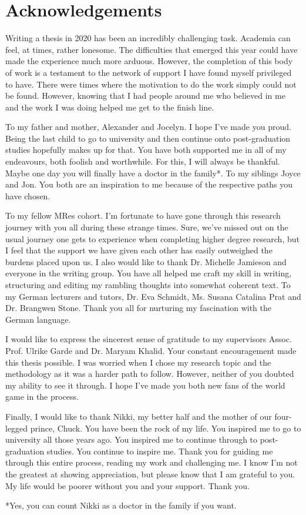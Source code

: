 

\chapter*{Acknowledgements}

Writing a thesis in 2020 has been an incredibly challenging task. Academia can feel, at times, rather lonesome. The difficulties that emerged this year could have made the experience much more arduous. However, the completion of this body of work is a testament to the network of support I have found myself privileged to have. There were times where the motivation to do the work simply could not be found. However, knowing that I had people around me who believed in me and the work I was doing helped me get to the finish line.


To my father and mother, Alexander and Jocelyn. I hope I’ve made you proud. Being the last child to go to university and then continue onto post-graduation studies hopefully makes up for that. You have both supported me in all of my endeavours, both foolish and worthwhile. For this, I will always be thankful. Maybe one day you will finally have a doctor in the family*. To my siblings Joyce and Jon. You both are an inspiration to me because of the respective paths you have chosen.


To my fellow MRes cohort. I’m fortunate to have gone through this research journey with you all during these strange times. Sure, we’ve missed out on the usual journey one gets to experience when completing higher degree research, but I feel that the support we have given each other has easily outweighed the burdens placed upon us. I also would like to thank Dr. Michelle Jamieson and everyone in the writing group. You have all helped me craft my skill in writing, structuring and editing my rambling thoughts into somewhat coherent text. To my German lecturers and tutors, Dr. Eva Schmidt, Ms. Susana Catalina Prat and Dr. Brangwen Stone. Thank you all for nurturing my fascination with the German language.


I would like to express the sincerest sense of gratitude to my supervisors Assoc. Prof. Ulrike Garde and Dr. Maryam Khalid. Your constant encouragement made this thesis possible. I was worried when I chose my research topic and the methodology as it was a harder path to follow. However, neither of you doubted my ability to see it through. I hope I’ve made you both new fans of the world game in the process.


Finally, I would like to thank Nikki, my better half and the mother of our four-legged prince, Chuck. You have been the rock of my life. You inspired me to go to university all those years ago. You inspired me to continue through to post-graduation studies. You continue to inspire me. Thank you for guiding me through this entire process, reading my work and challenging me. I know I’m not the greatest at showing appreciation, but please know that I am grateful to you. My life would be poorer without you and your support. Thank you.

\vfill
*Yes, you can count Nikki as a doctor in the family if you want.
